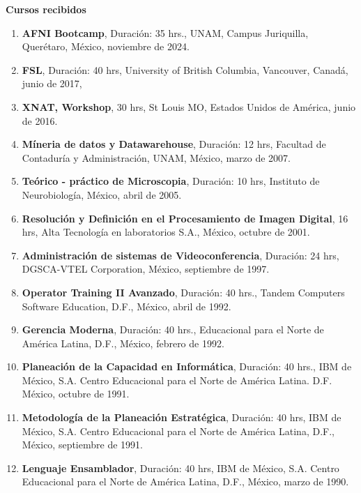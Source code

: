 \textbf{Cursos recibidos}

\begin{enumerate}
\item \textbf{AFNI Bootcamp}, Duración: 35 hrs., UNAM, Campus Juriquilla, Querétaro, México, noviembre de 2024.

\item \textbf{FSL}, Duración: 40 hrs, University of British Columbia, Vancouver, Canadá, junio de 2017, 

\item \textbf{XNAT, Workshop}, 30 hrs, St Louis MO, Estados Unidos de América, junio de 2016.

\item \textbf{Míneria de datos y Datawarehouse}, Duración: 12 hrs, Facultad de Contaduría y Administración, UNAM, México, 
marzo de 2007.

\item \textbf{Teórico - práctico de Microscopia}, Duración: 10 hrs, Instituto de Neurobiología, México, abril de 2005.

\item \textbf{Resolución y Definición en el Procesamiento de Imagen Digital}, 16 hrs, Alta Tecnología en laboratorios S.A., 
México, octubre de 2001.

\item \textbf{Administración de sistemas de Videoconferencia}, Duración: 24 hrs, 
DGSCA-VTEL Corporation, México, septiembre de 1997.

\item \textbf{Operator Training II Avanzado}, Duración: 40 hrs., Tandem 
Computers Software Education, D.F., México,  abril de 1992.

\item \textbf{Gerencia Moderna}, Duración: 40 hrs., Educacional 
para el Norte de América Latina, D.F., México, febrero de 1992.

\item \textbf{Planeación de la Capacidad en Informática}, Duración: 40 hrs., 
IBM de México, S.A. Centro Educacional para el Norte de América Latina. D.F. México, octubre de 1991.

\item \textbf{Metodología de la Planeación Estratégica}, Duración: 40 hrs, 
IBM de México, S.A. Centro Educacional para el Norte de América Latina, D.F., México, septiembre de 1991.

\item  \textbf{Lenguaje Ensamblador}, Duración: 40 hrs, IBM 
de 
México, 
S.A. Centro Educacional para el Norte de América Latina, D.F., México, marzo de 1990.


\end{enumerate}
